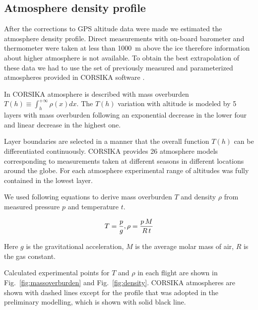 \documentclass[final,5p,times,twocolumn]{elsarticle}
\begin{document}
\subsection{Atmosphere density profile}
\label{sect:atmosphere-profile}

After the corrections to GPS altitude data were made we estimated the atmosphere density profile. Direct measurements with on-board barometer and thermometer were taken at less than 1000~m above the ice therefore information about higher atmosphere is not available. To obtain the best extrapolation of these data we had to use the set of previously measured and parameterized atmospheres provided in CORSIKA software \cite{hec98}.

In CORSIKA atmosphere is described with mass overburden $T(h) \equiv \int_{h}^{+\infty} \rho(x) dx$. The $T(h)$ variation with altitude is modeled by 5 layers with mass overburden following an exponential decrease in the lower four and linear decrease in the highest one.


Layer boundaries are selected in a manner that the overall function $T(h)$ can be differentiated continuously. CORSIKA provides 26 atmosphere models corresponding to measurements taken at different seasons in different locations around the globe. For each atmosphere experimental range of altitudes was fully contained in the lowest layer.

We used following equations to derive mass overburden $T$ and density $\rho$ from measured pressure $p$ and temperature $t$.

\begin{equation}
T     = \frac{p}{g}, \\
\rho  = \frac{p \, M}{R \, t} \\
\end{equation}

Here $g$ is the gravitational acceleration, $M$ is the average molar mass of air, $R$ is the gas constant.

Calculated experimental points for $T$ and $\rho$ in each flight are shown in Fig.~\ref{fig:massoverburden} and Fig.~\ref{fig:density}. CORSIKA atmospheres are shown with dashed lines except for the profile that was adopted in the preliminary modelling, which is shown with solid black line. 
\end{document}
